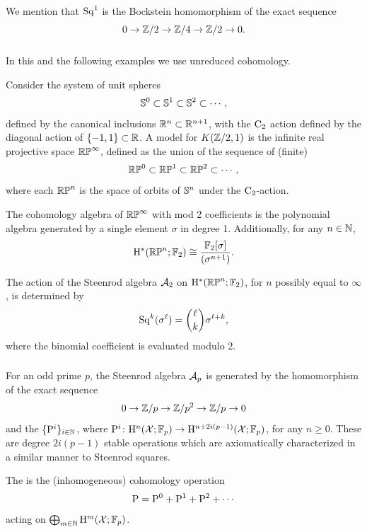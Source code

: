 We mention that $\mathrm{Sq}^1$ is the Bockstein homomorphism of the exact sequence
\[
0 \to \mathbb{Z}/2 \to \mathbb{Z}/4 \to \mathbb{Z}/2 \to 0.
\]

\subsubsection{}\label{sss:cohomology_rpn}

In this and the following examples we use unreduced cohomology.

Consider the system of unit spheres
\[
\mathbb{S}^0 \subset \mathbb{S}^1 \subset \mathbb{S}^2 \subset \dotsb,
\]
defined by the canonical inclusions \(\mathbb{R}^n \subset \mathbb{R}^{n+1}\), with the \(\mathrm{C}_2\) action defined by the diagonal action of \(\{-1,1\} \subset \mathbb{R}\).
A model for \(K(\mathbb{Z}/2,1)\) is the infinite real projective space \(\mathbb{RP}^\infty\), defined as the union of the sequence of (finite) 
\[
\mathbb{RP}^0 \subset \mathbb{RP}^1 \subset \mathbb{RP}^2 \subset \dotsb,
\]
where each \(\mathbb{RP}^n\) is the space of orbits of \(\mathbb{S}^n\) under the \(\mathrm{C}_2\)-action.

The cohomology algebra of $\mathbb{RP}^\infty$ with mod 2 coefficients is the polynomial algebra generated by a single element $\sigma$ in degree 1.
Additionally, for any $n \in \mathbb{N}$,
\[
\mathrm{H}^\ast(\mathbb{RP}^n; {\mathbb{F}_2}) \cong \frac{{\mathbb{F}_2}[\sigma]}{(\sigma^{n+1})}.
\]

The action of the Steenrod algebra $\mathcal{A}_2$ on $\mathrm{H}^\ast(\mathbb{RP}^n; {\mathbb{F}_2})$, for $n$ possibly equal to $\infty$, is determined by
\[
\mathrm{Sq}^k(\sigma^\ell) = \binom{\ell}{k}\sigma^{\ell+k},
\]
where the binomial coefficient is evaluated modulo \(2\).

\subsubsection{}\label{sss:steenrod_odd}

For an odd prime \(p\), the Steenrod algebra $\mathcal{A}_p$ is generated by the  homomorphism of the exact sequence
\[
0 \to \mathbb{Z}/p \to \mathbb{Z}/p^2 \to \mathbb{Z}/p \to 0
\]
and the  \(\{\mathrm{P}^i\}_{i \in \mathbb{N}}\), where $\mathrm{P}^i \colon \mathrm{H}^n(\mathcal{X}; {\mathbb{F}_p}) \to \mathrm{H}^{n+2i(p-1)}(\mathcal{X}; {\mathbb{F}_p})$, for any $n\geq 0$.
These are degree \(2i(p-1)\) stable operations which are axiomatically characterized in a similar manner to Steenrod squares.

The  is the (inhomogeneous) cohomology operation
\[
\mathrm{P} = \mathrm{P}^0 + \mathrm{P}^1 + \mathrm{P}^2 + \dotsb
\]
acting on \(\bigoplus_{m \in \mathbb{N}} \mathrm{H}^m(\mathcal{X}; {\mathbb{F}_p})\).

